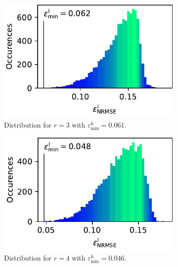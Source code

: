 \documentclass[
  a4paper,  %
  twoside,  %
  bibliography=totoc,
  headsepline,
  cleardoublepage=empty,
  parskip=half,
  draft=false
]{scrbook}
\begin{document}
\begin{mdframed}[style=style]
\begin{figure}[H]
\vspace{3mm}
  \begin{subfigure}{.5\textwidth}
  \centering
   \includegraphics[width=\linewidth]{graphics/ww_hist_3}
  \caption{Distribution for $r=3$ with $\varepsilon^\mathrm{h}_{\mathrm{min}}=0.061$.}
\vspace{3mm}
\label{fig:ishigami_hist_2}
\end{subfigure}%
\begin{subfigure}{.5\textwidth}
  \centering
   \includegraphics[width=\linewidth]{graphics/ww_hist_4}
  \caption{Distribution for $r=4$ with $\varepsilon^\mathrm{h}_{\mathrm{min}}=0.046$.}
\vspace{3mm}
\label{fig:ishigami_hist_3}
\end{subfigure}%
\vspace{3mm}
\begin{subfigure}{.5\textwidth}
  \centering

\end{subfigure}
\end{figure}
\end{mdframed}
\end{document}
